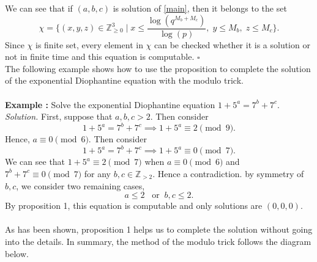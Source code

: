 \documentclass[12pt]{article}
\begin{document}
We can see that if $(a,b,c)$ is solution of \eqref{main}, then it belongs to the set \[\chi = \{(x,y,z)\in \mathbb{Z}_{\geq0}^3 \;| \; x\leq \dfrac{\log(q^{M_b + M_c})}{\log(p)},\;y\leq M_b, \;z\leq M_c\}.\]
Since $\chi$ is finite set, every element in $\chi$ can be checked whether it is a solution or not in finite time and this equation is computable. $\square$ \\
\newpage
The following example shows how to use the proposition to complete the solution of the exponential Diophantine equation with the modulo trick. \\\\
\textbf{Example : } Solve the exponential Diophantine equation $1+5^a = 7^b + 7^c$.\\
\textit{Solution. }First, suppose that $a,b,c > 2$. Then consider
\[1+5^a = 7^b + 7^c \implies 1+5^a \equiv 2 \pmod 9.\]
Hence, $a \equiv 0 \pmod 6$. Then consider 
\[1+5^a = 7^b + 7^c \implies 1+5^a \equiv 0 \pmod 7.\] We can see that $1+5^a \equiv 2 \pmod 7$ when $a\equiv 0 \pmod 6$ and $7^b + 7^c \equiv 0 \pmod 7$ for any $b,c \in \mathbb{Z}_{>2}$. Hence a contradiction. by symmetry of $b,c$, we consider two remaining cases,
\[a\leq 2 \; \;\;\text{or} \;\; b,c\leq 2.\]
By proposition 1, this equation is computable and only solutions are $(0,0,0)$. \\\\
\hspace*{0.5cm}As has been shown, proposition 1 helps us to complete the solution without going into the details. In summary, the method of the modulo trick follows the diagram below.
\end{document}
